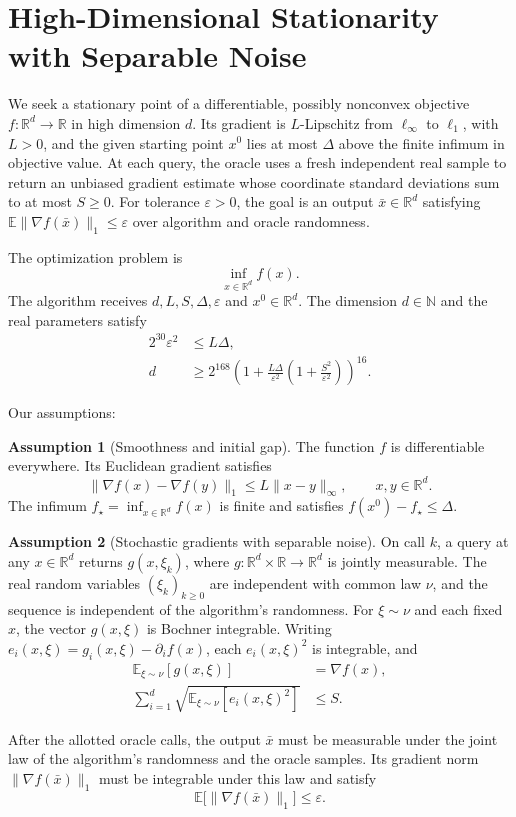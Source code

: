 \documentclass[10pt]{article}
\theoremstyle{definition}
\newtheorem{assumption}{Assumption}
\begin{document}
\section*{High-Dimensional Stationarity with Separable Noise}
We seek a stationary point of a differentiable, possibly nonconvex objective $f:\mathbb{R}^d\to\mathbb{R}$ in high dimension $d$. Its gradient is $L$-Lipschitz from $\ell_\infty$ to $\ell_1$, with $L>0$, and the given starting point $x^0$ lies at most $\Delta$ above the finite infimum in objective value. At each query, the oracle uses a fresh independent real sample to return an unbiased gradient estimate whose coordinate standard deviations sum to at most $S\geq 0$. For tolerance $\varepsilon>0$, the goal is an output $\bar{x}\in\mathbb{R}^d$ satisfying $\mathbb{E}\|\nabla f(\bar{x})\|_1\leq\varepsilon$ over algorithm and oracle randomness.

The optimization problem is
\[
\inf_{x\in\mathbb{R}^d} f(x).
\]
The algorithm receives $d,L,S,\Delta,\varepsilon$ and $x^0\in\mathbb{R}^d$. The dimension $d\in\mathbb{N}$ and the real parameters satisfy
\[
\begin{aligned}
2^{30}\varepsilon^2 &\leq L\Delta,\\
d &\geq 2^{168}\left(1+\frac{L\Delta}{\varepsilon^2}
\left(1+\frac{S^2}{\varepsilon^2}\right)\right)^{16}.
\end{aligned}
\]

Our assumptions:
\begin{assumption}[Smoothness and initial gap]
The function $f$ is differentiable everywhere. Its Euclidean gradient satisfies
\[
\|\nabla f(x)-\nabla f(y)\|_1\leq L\|x-y\|_\infty,
\qquad x,y\in\mathbb{R}^d.
\]
The infimum $f_\star=\inf_{x\in\mathbb{R}^d} f(x)$ is finite and satisfies $f(x^0)-f_\star\leq\Delta$.
\end{assumption}

\begin{assumption}[Stochastic gradients with separable noise]
On call $k$, a query at any $x\in\mathbb{R}^d$ returns $g(x,\xi_k)$, where $g:\mathbb{R}^d\times\mathbb{R}\to\mathbb{R}^d$ is jointly measurable. The real random variables $(\xi_k)_{k\geq 0}$ are independent with common law $\nu$, and the sequence is independent of the algorithm's randomness. For $\xi\sim\nu$ and each fixed $x$, the vector $g(x,\xi)$ is Bochner integrable. Writing $e_i(x,\xi)=g_i(x,\xi)-\partial_i f(x)$, each $e_i(x,\xi)^2$ is integrable, and
\[
\begin{aligned}
\mathbb{E}_{\xi\sim\nu}[g(x,\xi)] &= \nabla f(x),\\
\sum_{i=1}^d \sqrt{\mathbb{E}_{\xi\sim\nu}[e_i(x,\xi)^2]} &\leq S.
\end{aligned}
\]
\end{assumption}

After the allotted oracle calls, the output $\bar{x}$ must be measurable under the joint law of the algorithm's randomness and the oracle samples. Its gradient norm $\|\nabla f(\bar{x})\|_1$ must be integrable under this law and satisfy
\[
\mathbb{E}\bigl[\|\nabla f(\bar{x})\|_1\bigr]\leq\varepsilon.
\]
\end{document}

